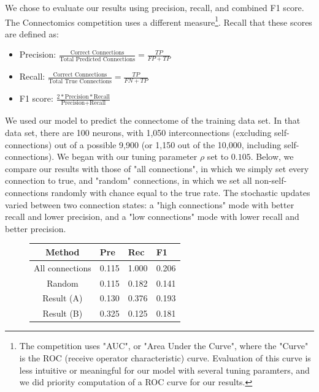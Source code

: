 \documentclass[11pt]{article}
\begin{document}
We chose to evaluate our results using precision, recall, and combined F1 score.  The Connectomics competition uses a different measure\footnote{The competition uses "AUC", or "Area Under the Curve", where the "Curve" is the ROC (receive operator characteristic) curve.  Evaluation of this curve is less intuitive or meaningful for our model with several tuning paramters, and we did priority computation of a ROC curve for our results.}.  Recall that these scores are defined as:

\begin{itemize}
	\item Precision: $\frac{\text{Correct Connections} }{ \text{Total Predicted Connections} } = \frac{ TP }{ FP + TP }$
	\item Recall: $\frac{ \text{Correct Connections} }{ \text{Total True Connections} } = \frac{ TP }{ FN + TP }$
	\item F1 score: $\frac{ 2 * \text{Precision} * \text{Recall} }{ \text{Precision} + \text{Recall} }$
\end{itemize}

We used our model to predict the connectome of the training data set.  In that data set, there are 100 neurons, with 1,050 interconnections (excluding self-connections) out of a possible 9,900 (or 1,150 out of the 10,000, including self-connections).  We began with our tuning parameter $\rho$ set to $0.105$.  Below, we compare our results with those of "all connections", in which we simply set every connection to true, and "random" connections, in which we set all non-self-connections randomly with chance equal to the true rate.  The stochastic updates varied between two connection states: a "high connections" mode with better recall and lower precision, and a "low connections" mode with lower recall and better precision.

\begin{figure}
\begin{center}
\begin{tabular}{ c l l l }
Method & Pre & Rec & F1 \\ \hline
All connections & 0.115 & 1.000 & 0.206 \\
Random & 0.115 & 0.182 & 0.141 \\
Result (A) & 0.130 & 0.376 & 0.193 \\
Result (B) & 0.325 & 0.125 & 0.181 \\
\end{tabular}
\end{center}
\end{figure}
\end{document}
